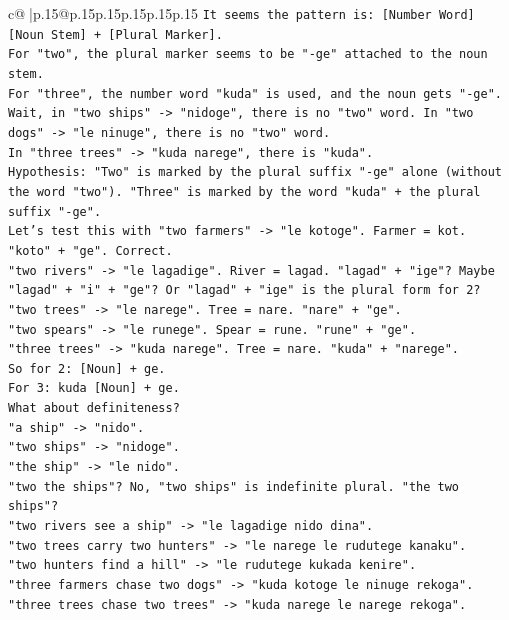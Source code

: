 \documentclass{article}
\begin{document}
{\begin{supertabular}{c@{$\;$}|p{.15\linewidth}@{}p{.15\linewidth}p{.15\linewidth}p{.15\linewidth}p{.15\linewidth}p{.15\linewidth}}
{{{\texttt{It seems the pattern is: {[}Number Word{]} {[}Noun Stem{]} + {[}Plural Marker{]}.} \\
\texttt{For "two", the plural marker seems to be "{-}ge" attached to the noun stem.} \\
\texttt{For "three", the number word "kuda" is used, and the noun gets "{-}ge".} \\
\texttt{Wait, in "two ships" {-}> "nidoge", there is no "two" word. In "two dogs" {-}> "le ninuge", there is no "two" word.} \\
\texttt{In "three trees" {-}> "kuda narege", there is "kuda".} \\
\texttt{Hypothesis: "Two" is marked by the plural suffix "{-}ge" alone (without the word "two"). "Three" is marked by the word "kuda" + the plural suffix "{-}ge".} \\
\texttt{Let's test this with "two farmers" {-}> "le kotoge". Farmer = kot. "koto" + "ge". Correct.} \\
\texttt{"two rivers" {-}> "le lagadige". River = lagad. "lagad" + "ige"? Maybe "lagad" + "i" + "ge"? Or "lagad" + "ige" is the plural form for 2?} \\
\texttt{"two trees" {-}> "le narege". Tree = nare. "nare" + "ge".} \\
\texttt{"two spears" {-}> "le runege". Spear = rune. "rune" + "ge".} \\
\texttt{"three trees" {-}> "kuda narege". Tree = nare. "kuda" + "narege".} \\
\texttt{So for 2: {[}Noun{]} + ge.} \\
\texttt{For 3: kuda {[}Noun{]} + ge.} \\
\texttt{What about definiteness?} \\
\texttt{"a ship" {-}> "nido".} \\
\texttt{"two ships" {-}> "nidoge".} \\
\texttt{"the ship" {-}> "le nido".} \\
\texttt{"two the ships"? No, "two ships" is indefinite plural. "the two ships"?} \\
\texttt{"two rivers see a ship" {-}> "le lagadige nido dina".} \\
\texttt{"two trees carry two hunters" {-}> "le narege le rudutege kanaku".} \\
\texttt{"two hunters find a hill" {-}> "le rudutege kukada kenire".} \\
\texttt{"three farmers chase two dogs" {-}> "kuda kotoge le ninuge rekoga".} \\
\texttt{"three trees chase two trees" {-}> "kuda narege le narege rekoga".} \\
}}}
\end{supertabular}}
\end{document}

